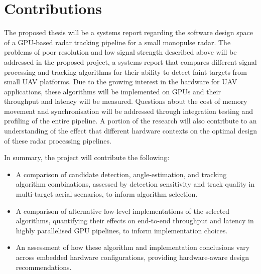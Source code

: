 \section{Contributions}

The proposed thesis will be a systems report regarding the software design space of a GPU-based radar tracking pipeline for a small monopulse radar. The problems of poor resolution and low signal strength described above will be addressed in the proposed project, a systems report that compares different signal processing and tracking algorithms for their ability to detect faint targets from small UAV platforms. Due to the growing interest in the hardware for UAV applications, these algorithms will be implemented on GPUs and their throughput and latency will be measured. Questions about the cost of memory movement and synchronisation will be addressed through integration testing and profiling of the entire pipeline. A portion of the research will also contribute to an understanding of the effect that different hardware contexts on the optimal design of these radar processing pipelines.

In summary, the project will contribute the following:
\begin{itemize}
    \item A comparison of candidate detection, angle-estimation, and tracking algorithm combinations, assessed by detection sensitivity and track quality in multi-target aerial scenarios, to inform algorithm selection.
    \item A comparison of alternative low-level implementations of the selected algorithms, quantifying their effects on end-to-end throughput and latency in highly parallelised GPU pipelines, to inform implementation choices.
    \item An assessment of how these algorithm and implementation conclusions vary across embedded hardware configurations, providing hardware-aware design recommendations.
\end{itemize}



